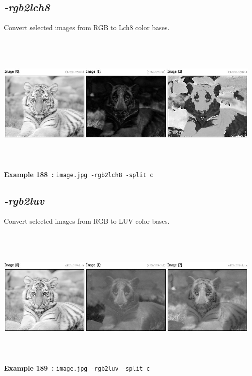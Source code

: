 \documentclass[a4paper,11pt,twoside]{book}
\begin{document}
\subsection{\emph{-rgb2lch8} }\vspace*{-0.5em}
Convert selected images from RGB to Lch8 color bases.
\begin{center}\includegraphics[keepaspectratio=true,height=7cm,width=\textwidth]{img/gmic_def188.jpg}\\
{\footnotesize \textbf{Example 188~:} \texttt{image.jpg -rgb2lch8 -split c}}
\end{center}

\subsection{\emph{-rgb2luv} }\vspace*{-0.5em}
Convert selected images from RGB to LUV color bases.
\begin{center}\includegraphics[keepaspectratio=true,height=7cm,width=\textwidth]{img/gmic_def189.jpg}\\
{\footnotesize \textbf{Example 189~:} \texttt{image.jpg -rgb2luv -split c}}
\end{center}
\end{document}
